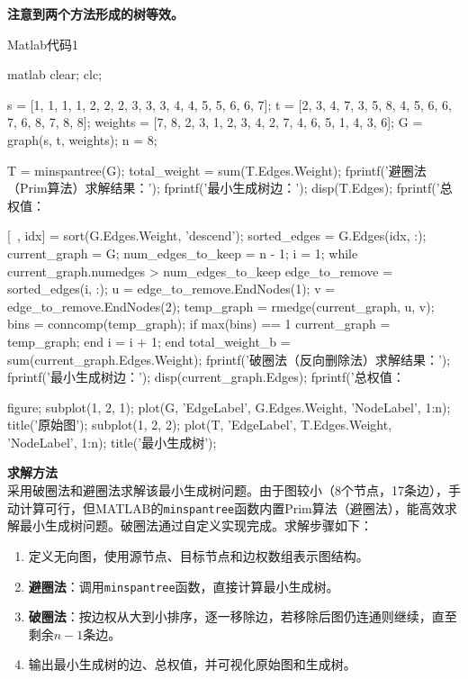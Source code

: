 \textbf{注意到两个方法形成的树等效。}
\begin{codebox}{Matlab代码}{1}
    \begin{amzcode}{matlab}
        clear; clc;
        
        s = [1, 1, 1, 1, 2, 2, 2, 3, 3, 3, 4, 4, 5, 5, 6, 6, 7]; %
        t = [2, 3, 4, 7, 3, 5, 8, 4, 5, 6, 6, 7, 6, 8, 7, 8, 8]; %
        weights = [7, 8, 2, 3, 1, 2, 3, 4, 2, 7, 4, 6, 5, 1, 4, 3, 6]; %
        G = graph(s, t, weights);
        n = 8; %
        
        T = minspantree(G);
        total_weight = sum(T.Edges.Weight);
        fprintf('避圈法（Prim算法）求解结果：\n');
        fprintf('最小生成树边：\n');
        disp(T.Edges);
        fprintf('总权值：%
        
        [~, idx] = sort(G.Edges.Weight, 'descend');
        sorted_edges = G.Edges(idx, :);
        current_graph = G;
        num_edges_to_keep = n - 1; %
        i = 1;
        while current_graph.numedges > num_edges_to_keep
            edge_to_remove = sorted_edges(i, :);
            u = edge_to_remove.EndNodes(1);
            v = edge_to_remove.EndNodes(2);
            temp_graph = rmedge(current_graph, u, v);
            bins = conncomp(temp_graph);
            if max(bins) == 1 %
                current_graph = temp_graph;
            end
            i = i + 1;
        end
        total_weight_b = sum(current_graph.Edges.Weight);
        fprintf('破圈法（反向删除法）求解结果：\n');
        fprintf('最小生成树边：\n');
        disp(current_graph.Edges);
        fprintf('总权值：%
        
        figure;
        subplot(1, 2, 1);
        plot(G, 'EdgeLabel', G.Edges.Weight, 'NodeLabel', 1:n);
        title('原始图');
        subplot(1, 2, 2);
        plot(T, 'EdgeLabel', T.Edges.Weight, 'NodeLabel', 1:n);
        title('最小生成树');
    \end{amzcode}
\end{codebox}

\textbf{求解方法}\\
采用破圈法和避圈法求解该最小生成树问题。由于图较小（8个节点，17条边），手动计算可行，但MATLAB的\texttt{minspantree}函数内置Prim算法（避圈法），能高效求解最小生成树问题。破圈法通过自定义实现完成。求解步骤如下：
\begin{enumerate}
    \item 定义无向图，使用源节点、目标节点和边权数组表示图结构。
    \item \textbf{避圈法}：调用\texttt{minspantree}函数，直接计算最小生成树。
    \item \textbf{破圈法}：按边权从大到小排序，逐一移除边，若移除后图仍连通则继续，直至剩余\( n-1 \)条边。
    \item 输出最小生成树的边、总权值，并可视化原始图和生成树。
\end{enumerate}

